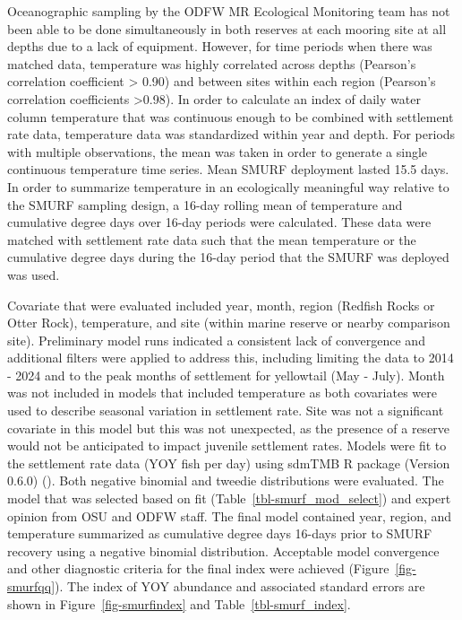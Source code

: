 \documentclass[
]{scrartcl}
\begin{document}
Oceanographic sampling by the ODFW MR Ecological Monitoring team has not
been able to be done simultaneously in both reserves at each mooring
site at all depths due to a lack of equipment. However, for time periods
when there was matched data, temperature was highly correlated across
depths (Pearson's correlation coefficient \textgreater{} 0.90) and
between sites within each region (Pearson's correlation coefficients
\textgreater0.98). In order to calculate an index of daily water column
temperature that was continuous enough to be combined with settlement
rate data, temperature data was standardized within year and depth. For
periods with multiple observations, the mean was taken in order to
generate a single continuous temperature time series. Mean SMURF
deployment lasted 15.5 days. In order to summarize temperature in an
ecologically meaningful way relative to the SMURF sampling design, a
16-day rolling mean of temperature and cumulative degree days over
16-day periods were calculated. These data were matched with settlement
rate data such that the mean temperature or the cumulative degree days
during the 16-day period that the SMURF was deployed was used.

Covariate that were evaluated included year, month, region (Redfish
Rocks or Otter Rock), temperature, and site (within marine reserve or
nearby comparison site). Preliminary model runs indicated a consistent
lack of convergence and additional filters were applied to address this,
including limiting the data to 2014 - 2024 and to the peak months of
settlement for yellowtail (May - July). Month was not included in models
that included temperature as both covariates were used to describe
seasonal variation in settlement rate. Site was not a significant
covariate in this model but this was not unexpected, as the presence of
a reserve would not be anticipated to impact juvenile settlement rates.
Models were fit to the settlement rate data (YOY fish per day) using
sdmTMB R package (Version 0.6.0)
(). Both negative
binomial and tweedie distributions were evaluated. The model that was
selected based on fit (Table~\ref{tbl-smurf_mod_select}) and expert
opinion from OSU and ODFW staff. The final model contained year, region,
and temperature summarized as cumulative degree days 16-days prior to
SMURF recovery using a negative binomial distribution. Acceptable model
convergence and other diagnostic criteria for the final index were
achieved (Figure~\ref{fig-smurfqq}). The index of YOY abundance and
associated standard errors are shown in Figure~\ref{fig-smurfindex} and
Table~\ref{tbl-smurf_index}.
\end{document}

